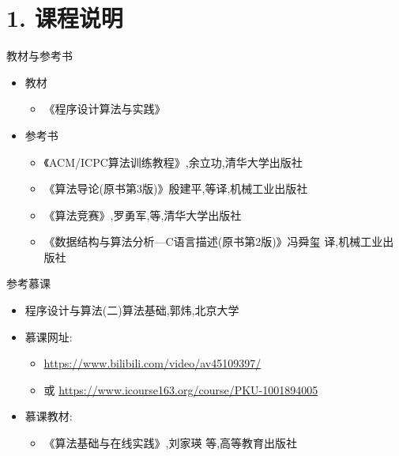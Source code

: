 


\frame{\titlepage}
\section{1. 课程说明}
\begin{frame}{教材与参考书}
    \begin{itemize}
        \item 教材
        \begin{itemize}
            \item《程序设计算法与实践》
        \end{itemize}
        \vfill
        \item 参考书
        \begin{itemize}
            \item 《ACM/ICPC算法训练教程》,余立功,清华大学出版社
            \item 《算法导论(原书第3版)》殷建平,等译,机械工业出版社
            \item 《算法竞赛》,罗勇军,等,清华大学出版社
            \item 《数据结构与算法分析—C语言描述(原书第2版)》冯舜玺 译,机械工业出版社
        \end{itemize}
    \end{itemize}
\end{frame}
\begin{frame}{参考慕课}
    \begin{itemize}
        \item 程序设计与算法(二)算法基础,郭炜,北京大学
        \vfill
        \item 慕课网址:
        \begin{itemize}
            \item \url{https://www.bilibili.com/video/av45109397/}
            \item 或 \url{https://www.icourse163.org/course/PKU-1001894005}
        \end{itemize}
        \vfill
        \item 慕课教材:
        \begin{itemize}
            \item 《算法基础与在线实践》,刘家瑛 等,高等教育出版社
        \end{itemize}
    \end{itemize}
\end{frame}
